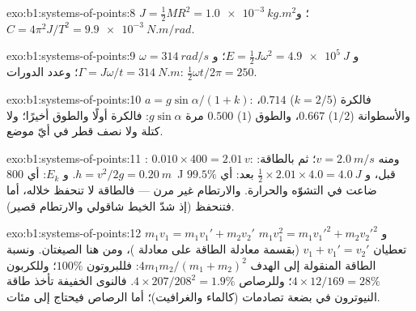 \begin{solution}{exo:b1:systems-of-points:8}
$J = \tfrac12 MR^2 = \qty{1.0e-3}{kg.m^2}$؛ و $C = 4\pi^2J/T^2 = \qty{9.9e-3}{N.m/rad}$.
\end{solution}

\begin{solution}{exo:b1:systems-of-points:9}
$\omega = \qty{314}{rad/s}$ و $E = \tfrac12 J\omega^2 = \qty{4.9e5}{J}$؛
و $\Gamma = J\omega/t = \qty{314}{N.m}$؛ وعدد الدورات: $\tfrac12\omega t/2\pi = 250$.
\end{solution}

\begin{solution}{exo:b1:systems-of-points:10}
$a = g\sin\alpha/(1 + k)$: فالكرة ($k = 2/5$) $0.714$، والأسطوانة ($1/2$)
$0.667$، والطوق ($1$) $0.500$ مرة $g\sin\alpha$: فالكرة أولًا والطوق أخيرًا؛
ولا كتلة ولا نصف قطر في أيّ موضع.
\end{solution}

\begin{solution}{exo:b1:systems-of-points:11}
: $0.010 \times 400 = 2.01\,v$: ومنه $v = \qty{2.0}{m/s}$؛ ثم بالطاقة:
$h = v^2/2g = \qty{0.20}{m}$. و $E_k$: أي \qty{800}{J} قبل، و $\tfrac12 \times
2.01 \times 4.0 = \qty{4.0}{J}$ بعد: أي $99.5\%$ ضاعت في التشوّه
والحرارة. والارتطام غير مرن --- فالطاقة لا تنحفظ خلاله،
أما  فتنحفظ (إذ شدّ الخيط شاقولي والارتطام قصير).
\end{solution}

\begin{solution}{exo:b1:systems-of-points:12}
$m_1v_1 = m_1v_1' + m_2v_2'$ و $m_1v_1^2 = m_1v_1'^2 + m_2v_2'^2$ تعطيان
$v_1 + v_1' = v_2'$ (بقسمة معادلة الطاقة على معادلة )،
ومن هنا الصيغتان. ونسبة الطاقة المنقولة إلى الهدف $4m_1m_2/(m_1 + m_2)^2$:
فللبروتون $100\%$؛ وللكربون $4 \times 12/169 = 28\%$؛ وللرصاص $4 \times 207/208^2 =
1.9\%$. فالنوى الخفيفة تأخذ طاقة النيوترون في بضعة تصادمات
(كالماء والغرافيت)؛ أما الرصاص فيحتاج إلى مئات.
\end{solution}

